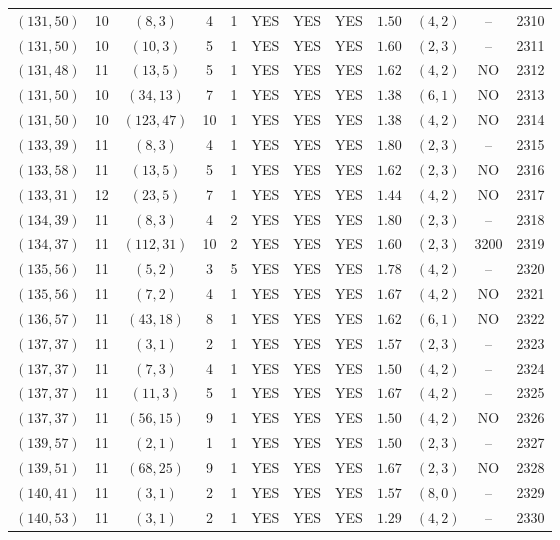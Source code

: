 \begin{longtable}{|c|c|c|c|c|c|c|c|c|c|c|c|}
$(131,50)$ & 10 & $(8,3)$ & 4 & 1 & YES & YES & YES & $1.50$ & $(4,2)$ & -- & 2310\\
$(131,50)$ & 10 & $(10,3)$ & 5 & 1 & YES & YES & YES & $1.60$ & $(2,3)$ & -- & 2311\\
$(131,48)$ & 11 & $(13,5)$ & 5 & 1 & YES & YES & YES & $1.62$ & $(4,2)$ & NO & 2312\\
$(131,50)$ & 10 & $(34,13)$ & 7 & 1 & YES & YES & YES & $1.38$ & $(6,1)$ & NO & 2313\\
$(131,50)$ & 10 & $(123,47)$ & 10 & 1 & YES & YES & YES & $1.38$ & $(4,2)$ & NO & 2314\\
$(133,39)$ & 11 & $(8,3)$ & 4 & 1 & YES & YES & YES & $1.80$ & $(2,3)$ & -- & 2315\\
$(133,58)$ & 11 & $(13,5)$ & 5 & 1 & YES & YES & YES & $1.62$ & $(2,3)$ & NO & 2316\\
$(133,31)$ & 12 & $(23,5)$ & 7 & 1 & YES & YES & YES & $1.44$ & $(4,2)$ & NO & 2317\\
$(134,39)$ & 11 & $(8,3)$ & 4 & 2 & YES & YES & YES & $1.80$ & $(2,3)$ & -- & 2318\\
$(134,37)$ & 11 & $(112,31)$ & 10 & 2 & YES & YES & YES & $1.60$ & $(2,3)$ & 3200 & 2319\\
$(135,56)$ & 11 & $(5,2)$ & 3 & 5 & YES & YES & YES & $1.78$ & $(4,2)$ & -- & 2320\\
$(135,56)$ & 11 & $(7,2)$ & 4 & 1 & YES & YES & YES & $1.67$ & $(4,2)$ & NO & 2321\\
$(136,57)$ & 11 & $(43,18)$ & 8 & 1 & YES & YES & YES & $1.62$ & $(6,1)$ & NO & 2322\\
$(137,37)$ & 11 & $(3,1)$ & 2 & 1 & YES & YES & YES & $1.57$ & $(2,3)$ & -- & 2323\\
$(137,37)$ & 11 & $(7,3)$ & 4 & 1 & YES & YES & YES & $1.50$ & $(4,2)$ & -- & 2324\\
$(137,37)$ & 11 & $(11,3)$ & 5 & 1 & YES & YES & YES & $1.67$ & $(4,2)$ & -- & 2325\\
$(137,37)$ & 11 & $(56,15)$ & 9 & 1 & YES & YES & YES & $1.50$ & $(4,2)$ & NO & 2326\\
$(139,57)$ & 11 & $(2,1)$ & 1 & 1 & YES & YES & YES & $1.50$ & $(2,3)$ & -- & 2327\\
$(139,51)$ & 11 & $(68,25)$ & 9 & 1 & YES & YES & YES & $1.67$ & $(2,3)$ & NO & 2328\\
$(140,41)$ & 11 & $(3,1)$ & 2 & 1 & YES & YES & YES & $1.57$ & $(8,0)$ & -- & 2329\\
$(140,53)$ & 11 & $(3,1)$ & 2 & 1 & YES & YES & YES & $1.29$ & $(4,2)$ & -- & 2330\\

\end{longtable}
